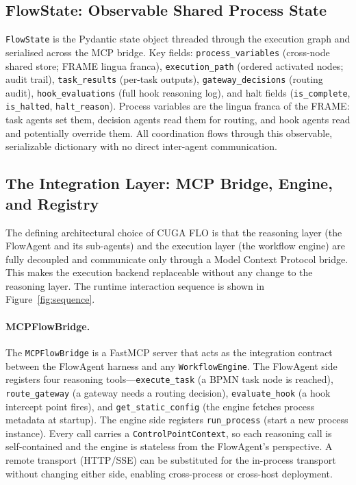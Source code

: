 \documentclass[11pt,a4paper]{article}
\begin{document}
\subsection{FlowState: Observable Shared Process State}

\texttt{FlowState} is the Pydantic state object threaded through the execution graph
and serialised across the MCP bridge. Key fields: \texttt{process\_variables} (cross-node shared store; FRAME
lingua franca), \texttt{execution\_path} (ordered activated nodes; audit trail),
\texttt{task\_results} (per-task outputs), \texttt{gateway\_decisions} (routing
audit), \texttt{hook\_evaluations} (full hook reasoning log), and halt fields
(\texttt{is\_complete}, \texttt{is\_halted}, \texttt{halt\_reason}). Process
variables are the lingua franca of the FRAME: task agents set them, decision agents
read them for routing, and hook agents read and potentially override them. All
coordination flows through this observable, serializable dictionary with no
direct inter-agent communication.

\subsection{The Integration Layer: MCP Bridge, Engine, and Registry}
\label{sec:integration}

The defining architectural choice of CUGA FLO is that the reasoning layer (the
FlowAgent and its sub-agents) and the execution layer (the workflow engine) are
fully decoupled and communicate only through a Model Context Protocol bridge. This
makes the execution backend replaceable without any change to the reasoning layer.
The runtime interaction sequence is shown in Figure~\ref{fig:sequence}.

\paragraph{MCPFlowBridge.}
The \texttt{MCPFlowBridge} is a FastMCP server that acts as the integration contract
between the FlowAgent harness and any \texttt{WorkflowEngine}. The FlowAgent side
registers four reasoning tools---\texttt{execute\_task} (a BPMN task node is
reached), \texttt{route\_gateway} (a gateway needs a routing decision),
\texttt{evaluate\_hook} (a hook intercept point fires), and
\texttt{get\_static\_config} (the engine fetches process metadata at startup). The
engine side registers \texttt{run\_process} (start a new process instance). Every
call carries a \texttt{ControlPointContext}, so each reasoning call is self-contained
and the engine is stateless from the FlowAgent's perspective. A remote transport
(HTTP/SSE) can be substituted for the in-process transport without changing either
side, enabling cross-process or cross-host deployment.
\end{document}
